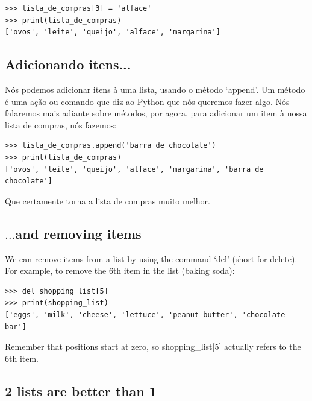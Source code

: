\begin{listing}
\begin{verbatim}
>>> lista_de_compras[3] = 'alface'
>>> print(lista_de_compras)
['ovos', 'leite', 'queijo', 'alface', 'margarina']
\end{verbatim}
\end{listing}

\subsection*{\color{BrickRed}Adicionando itens...}

Nós podemos adicionar itens à uma lista, usando o método `append'. Um método é uma ação ou comando que diz ao Python que nós queremos fazer algo. Nós falaremos mais adiante sobre métodos, por agora, para adicionar um item à nossa lista de compras, nós fazemos:

\begin{listing}
\begin{verbatim}
>>> lista_de_compras.append('barra de chocolate')
>>> print(lista_de_compras)
['ovos', 'leite', 'queijo', 'alface', 'margarina', 'barra de chocolate']
\end{verbatim}
\end{listing}

Que certamente torna a lista de compras muito melhor.

\subsection*{\color{BrickRed}$\ldots$and removing items}

We can remove items from a list by using the command `del' (short for delete).  For example, to remove the 6th item in the list (baking soda):

\begin{listing}
\begin{verbatim}
>>> del shopping_list[5]
>>> print(shopping_list)
['eggs', 'milk', 'cheese', 'lettuce', 'peanut butter', 'chocolate bar']
\end{verbatim}
\end{listing}

Remember that positions start at zero, so shopping\_list[5] actually refers to the 6th item.

\subsection*{\color{BrickRed}2 lists are better than 1}

